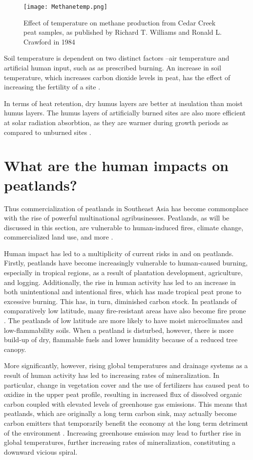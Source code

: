 \begin{figure}
\texttt{[image: Methanetemp.png]}
  \caption{Effect of temperature on methane production from Cedar Creek peat samples, as published by Richard T. Williams and Ronald L. Crawford in 1984}
  \label{fig:soiltemperature}
\end{figure}

Soil temperature is dependent on two distinct factors --air temperature and artificial human input, such as as prescribed burning. An increase in soil temperature, which increases carbon dioxide levels in peat, has the effect of increasing the fertility of a site \citep{kozlowski2012fire}.

In terms of heat retention, dry humus layers are better at insulation than moist humus layers. The humus layers of artificially burned sites are also more efficient at solar radiation absorbtion, as they are warmer during growth periods as compared to unburned sites \citep{kozlowski2012fire}.

\section{What are the human impacts on peatlands?}

Thus commercialization of peatlands in Southeast Asia has become commonplace with the rise of powerful multinational agribusinesses. Peatlands, as will be discussed in this section, are vulnerable to human-induced fires, climate change, commercialized land use, and more \citep{turetsky2015global}. 

Human impact has led to a multiplicity of current risks in and on peatlands. Firstly, peatlands have become increasingly vulnerable to human-caused burning, especially in tropical regions, as a result of plantation development, agriculture, and logging. Additionally, the rise in human activity has led to an increase in both unintentional and intentional fires, which has made tropical peat prone to excessive burning. This has, in turn, diminished carbon stock. In peatlands of comparatively low latitude, many fire-resistant areas have also become fire prone \citep{turetsky2015global}. The peatlands of low latitude are more likely to have moist microclimates and low-flammability soils. When a peatland is disturbed, however, there is more build-up of dry, flammable fuels and lower humidity because of a reduced tree canopy. 

More significantly, however, rising global temperatures and drainage systems as a result of human activity has led to increasing rates of mineralization. In particular, change in vegetation cover and the use of fertilizers has caused peat to oxidize in the upper peat profile, resulting in increased flux of dissolved organic carbon coupled with elevated levels of greenhouse gas emissions. This means that peatlands, which are originally a long term carbon sink, may actually become carbon emitters that temporarily benefit the economy at the long term detriment of the environment \citep{turetsky2015global}. Increasing greenhouse emission may lead to further rise in global temperatures, further increasing rates of mineralization, constituting a downward vicious spiral.

